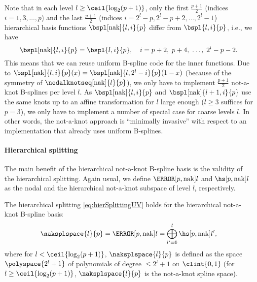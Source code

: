 Note that in each level $l \ge \ceil{\log_2(p+1)}$,
only the first $\tfrac{p+1}{2}$
(indices $i = 1, 3, \dotsc, p$)
and the last $\tfrac{p+1}{2}$
(indices $i = 2^l - p, 2^l - p + 2, \dotsc, 2^l - 1$)
hierarchical basis functions $\bspl[\nak]{l,i}{p}$
differ from $\bspl{l,i}{p}$,
i.e., we have
\begin{equation}
  \bspl[\nak]{l,i}{p} = \bspl{l,i}{p},\quad
  i = p + 2,\; p + 4,\; \dotsc,\; 2^l - p - 2.
\end{equation}
This means that we can reuse uniform B-spline code
for the inner functions.
Due to $\bspl[\nak]{l,i}{p}(x) = \bspl[\nak]{l,2^l-i}{p}(1-x)$
(because of the symmetry of $\nodalknotseq[\nak]{l}{p}$),
we only have to implement $\tfrac{p+1}{2}$ not-a-knot B-splines per level $l$.
As $\bspl[\nak]{l,i}{p}$ and $\bspl[\nak]{l+1,i}{p}$
use the same knots up to an affine transformation for $l$ large enough
($l \ge 3$ suffices for $p = 3$),
we only have to implement a number of special case for coarse levels $l$.
In other words, the not-a-knot approach is ``minimally invasive''
with respect to an implementation that already uses uniform B-splines.

\paragraph{Hierarchical splitting}

The main benefit of the hierarchical not-a-knot B-spline basis
is the validity of the hierarchical splitting.
Again usual, we define $\nsbspl[\nak]{l}{p}$ and $\hsbspl[\nak]{l}{p}$
as the nodal and the hierarchical not-a-knot subspace of level $l$,
respectively.

\begin{proposition}
  \label{prop:hierSplittingNAKBSplineUV}
  The hierarchical splitting \eqref{eq:hierSplittingUV}
  holds for the hierarchical not-a-knot B-spline basis:
  \begin{equation}
    \naksplspace{l}{p}
    = \nsbspl[\nak]{l}{p}
    = \bigoplus_{l'=0}^l \hsbspl[\nak]{l'}{p},
  \end{equation}
  where for $l < \ceil{\log_2(p+1)}$, $\naksplspace{l}{p}$
  is defined as the space $\polyspace{2^l + 1}$ of polynomials of degree
  $\le 2^l + 1$ on $\clint{0, 1}$
  (for $l \ge \ceil{\log_2(p+1)}$,
  $\naksplspace{l}{p}$ is the not-a-knot spline space).
\end{proposition}

